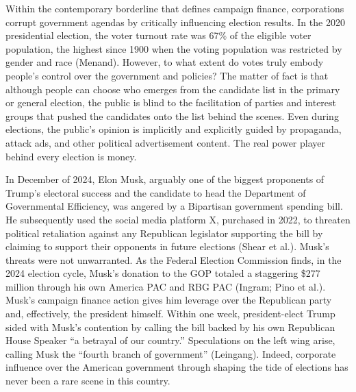 \documentclass[12pt, a4paper, twoside]{article}
\begin{document}
Within the contemporary borderline that defines campaign finance, corporations corrupt government agendas by critically influencing election results. In the 2020 presidential election, the voter turnout rate was 67\% of the eligible voter population, the highest since 1900 when the voting population was restricted by gender and race (Menand). However, to what extent do votes truly embody people’s control over the government and policies? The matter of fact is that although people can choose who emerges from the candidate list in the primary or general election, the public is blind to the facilitation of parties and interest groups that pushed the candidates onto the list behind the scenes. Even during elections, the public’s opinion is implicitly and explicitly guided by propaganda, attack ads, and other political advertisement content. The real power player behind every election is money. 

In December of 2024, Elon Musk, arguably one of the biggest proponents of Trump’s electoral success and the candidate to head the Department of Governmental Efficiency, was angered by a Bipartisan government spending bill. He subsequently used the social media platform X, purchased in 2022, to threaten political retaliation against any Republican legislator supporting the bill by claiming to support their opponents in future elections (Shear et al.). Musk’s threats were not unwarranted. As the Federal Election Commission finds, in the 2024 election cycle, Musk’s donation to the GOP totaled a staggering \$277 million through his own America PAC and RBG PAC (Ingram; Pino et al.). Musk’s campaign finance action gives him leverage over the Republican party and, effectively, the president himself. Within one week, president-elect Trump sided with Musk’s contention by calling the bill backed by his own Republican House Speaker “a betrayal of our country.” Speculations on the left wing arise, calling Musk the “fourth branch of government” (Leingang). Indeed, corporate influence over the American government through shaping the tide of elections has never been a rare scene in this country. 
\end{document}

